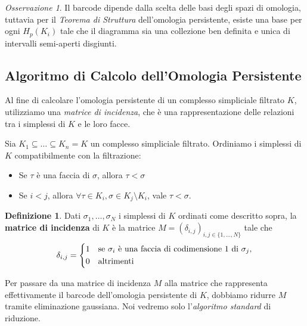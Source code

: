 \documentclass[a4paper, 12pt]{article}
\theoremstyle{definition}
\newtheorem{definition}{Definizione}[section]
\theoremstyle{remark}
\newtheorem{remark}[theorem]{Osservazione}
\begin{document}
\begin{remark}
    Il barcode dipende dalla scelta delle basi degli spazi di omologia, tuttavia per il \textit{Teorema di Struttura}\cite{Zomorodian} dell'omologia persistente, esiste una base per ogni $H_p(K_i)$ tale che il diagramma sia una collezione ben definita e unica di intervalli semi-aperti disgiunti.
\end{remark}

\subsection{Algoritmo di Calcolo dell'Omologia Persistente}
Al fine di calcolare l'omologia persistente di un complesso simpliciale filtrato $K$, utilizziamo una \textit{matrice di incidenza}, che è una rappresentazione delle relazioni tra i simplessi di $K$ e le loro facce.

Sia $K_1 \subseteq \dots \subseteq K_n = K$ un complesso simpliciale filtrato. Ordiniamo i simplessi di $K$ compatibilmente con la filtrazione:
\begin{itemize}
    \item Se $\tau$ è una faccia di $\sigma$, allora $\tau < \sigma$
    \item Se $i < j$, allora $\forall \tau \in K_i, \sigma \in K_j \setminus K_i$, vale $\tau < \sigma$.
\end{itemize}

\begin{definition}
    Dati $ \sigma_1, \dots, \sigma_N$ i simplessi di $K$ ordinati come descritto sopra, la \textbf{matrice di incidenza} di $K$ è la matrice $M = (\delta_{i,j})_{i,j \in \{1, \dots, N\}}$ tale che
    \begin{align*}
        \delta_{i,j} = \begin{cases*}
            1 & se $\sigma_i$ è una faccia di codimensione $1$ di $\sigma_j$,\\
            0 & \text{altrimenti}
        \end{cases*}
    \end{align*}

\end{definition}

Per passare da una matrice di incidenza $M$ alla matrice che rappresenta effettivamente il barcode dell'omologia persistente di $K$, dobbiamo ridurre $M$ tramite eliminazione gaussiana. Noi vedremo solo l'\textit{algoritmo standard} di riduzione.

\end{document}
